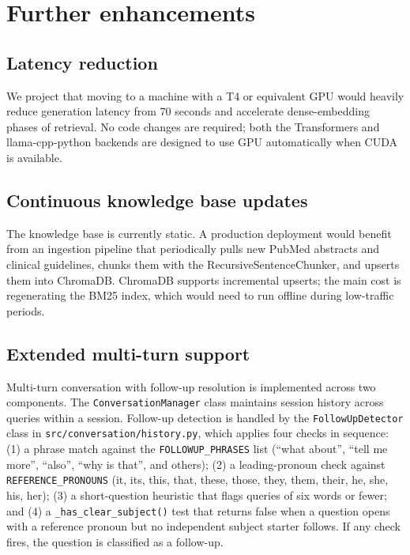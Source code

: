 \section{Further enhancements}

\subsection{Latency reduction}

We project that moving to a machine with a T4 or equivalent GPU would heavily reduce generation latency from 70 seconds and accelerate dense-embedding phases of retrieval. No code changes are required; both the Transformers and llama-cpp-python backends are designed to use GPU automatically when CUDA is available.

\subsection{Continuous knowledge base updates}

The knowledge base is currently static. A production deployment would benefit from an ingestion pipeline that periodically pulls new PubMed abstracts and clinical guidelines, chunks them with the RecursiveSentenceChunker, and upserts them into ChromaDB. ChromaDB supports incremental upserts; the main cost is regenerating the BM25 index, which would need to run offline during low-traffic periods.

\subsection{Extended multi-turn support}

Multi-turn conversation with follow-up resolution is implemented across two components. The \texttt{ConversationManager} class maintains session history across queries within a session. Follow-up detection is handled by the \texttt{FollowUpDetector} class in \texttt{src/\allowbreak conversation/history.py}, which applies four checks in sequence: (1) a phrase match against the \texttt{FOLLOWUP\_PHRASES} list (``what about'', ``tell me more'', ``also'', ``why is that'', and others); (2) a leading-pronoun check against \texttt{REFERENCE\_\allowbreak PRONOUNS} (it, its, this, that, these, those, they, them, their, he, she, his, her); (3) a short-question heuristic that flags queries of six words or fewer; and (4) a \texttt{\_has\_clear\_subject()} test that returns false when a question opens with a reference pronoun but no independent subject starter follows. If any check fires, the question is classified as a follow-up.

